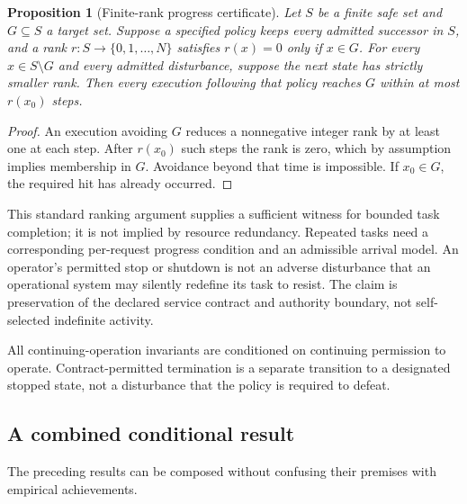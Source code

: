 \documentclass[11pt,a4paper]{article}
\newtheorem{proposition}[theorem]{Proposition}
\theoremstyle{definition}
\theoremstyle{remark}
\begin{document}
\begin{proposition}[Finite-rank progress certificate]\label{prop:progress}
Let $S$ be a finite safe set and $G\subseteq S$ a target set. Suppose a specified policy keeps every admitted successor in $S$, and a rank $r:S\to\{0,1,\ldots,N\}$ satisfies $r(x)=0$ only if $x\in G$. For every $x\in S\setminus G$ and every admitted disturbance, suppose the next state has strictly smaller rank. Then every execution following that policy reaches $G$ within at most $r(x_0)$ steps.
\end{proposition}
\begin{proof}
An execution avoiding $G$ reduces a nonnegative integer rank by at least one at each step. After $r(x_0)$ such steps the rank is zero, which by assumption implies membership in $G$. Avoidance beyond that time is impossible. If $x_0\in G$, the required hit has already occurred.
\end{proof}

This standard ranking argument supplies a sufficient witness for bounded task completion; it is not implied by resource redundancy. Repeated tasks need a corresponding per-request progress condition and an admissible arrival model. An operator's permitted stop or shutdown is not an adverse disturbance that an operational system may silently redefine its task to resist. The claim is preservation of the declared service contract and authority boundary, not self-selected indefinite activity.

All continuing-operation invariants are conditioned on continuing permission to operate. Contract-permitted termination is a separate transition to a designated stopped state, not a disturbance that the policy is required to defeat.


\Needspace{0.23\textheight}
\subsection{A combined conditional result}
The preceding results can be composed without confusing their premises with empirical achievements.
\end{document}
